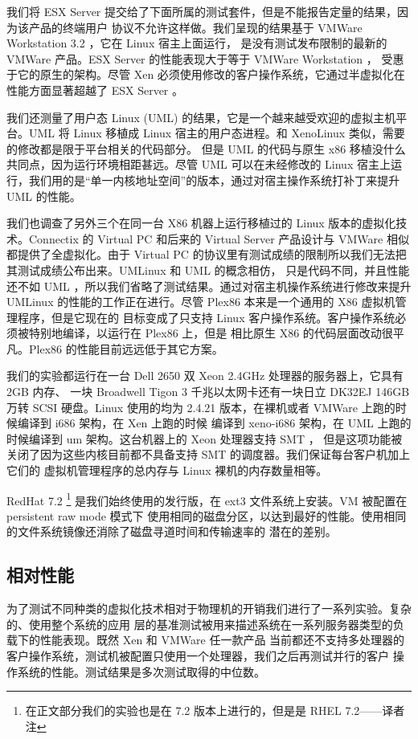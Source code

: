 我们将 ESX Server 提交给了下面所属的测试套件，但是不能报告定量的结果，因为该产品的终端用户
协议不允许这样做。我们呈现的结果基于 VMWare Workstation 3.2 ，它在 Linux 宿主上面运行，
是没有测试发布限制的最新的 VMWare 产品。ESX Server 的性能表现大于等于 VMWare Workstation ，
受惠于它的原生的架构。尽管 Xen 必须使用修改的客户操作系统，它通过半虚拟化在性能方面显著超越了
ESX Server 。

我们还测量了用户态 Linux (UML) 的结果，它是一个越来越受欢迎的虚拟主机平台。UML 将 Linux
移植成 Linux 宿主的用户态进程。和 XenoLinux 类似，需要的修改都是限于平台相关的代码部分。
但是 UML 的代码与原生 x86 移植没什么共同点，因为运行环境相距甚远。尽管 UML 可以在未经修改的
Linux 宿主上运行，我们用的是“单一内核地址空间”的版本，通过对宿主操作系统打补丁来提升 UML 的性能。

我们也调查了另外三个在同一台 X86 机器上运行移植过的 Linux 版本的虚拟化技术。Connectix 的
Virtual PC 和后来的 Virtual Server 产品设计与 VMWare 相似都提供了全虚拟化。由于 Virtual
PC 的协议里有测试成绩的限制所以我们无法把其测试成绩公布出来。UMLinux 和 UML 的概念相仿，
只是代码不同，并且性能还不如 UML ，所以我们省略了测试结果。通过对宿主机操作系统进行修改来提升
UMLinux 的性能的工作正在进行。尽管 Plex86 本来是一个通用的 X86 虚拟机管理程序，但是它现在的
目标变成了只支持 Linux 客户操作系统。客户操作系统必须被特别地编译，以运行在 Plex86 上，但是
相比原生 X86 的代码层面改动很平凡。Plex86 的性能目前远远低于其它方案。

我们的实验都运行在一台 Dell 2650 双 Xeon 2.4GHz 处理器的服务器上，它具有 2GB 内存、
一块 Broadwell Tigon 3 千兆以太网卡还有一块日立 DK32EJ 146GB 万转 SCSI 硬盘。Linux
使用的均为 2.4.21 版本，在裸机或者 VMWare 上跑的时候编译到 i686 架构，在 Xen 上跑的时候
编译到 xeno-i686 架构，在 UML 上跑的时候编译到 um 架构。这台机器上的 Xeon 处理器支持 SMT ，
但是这项功能被关闭了因为这些内核目前都不具备支持 SMT 的调度器。我们保证每台客户机加上它们的
虚拟机管理程序的总内存与 Linux 裸机的内存数量相等。

RedHat 7.2 \footnote{在正文部分我们的实验也是在 7.2 版本上进行的，但是是 RHEL 7.2——译者注}
是我们始终使用的发行版，在 ext3 文件系统上安装。VM 被配置在 persistent raw mode 模式下
使用相同的磁盘分区，以达到最好的性能。使用相同的文件系统镜像还消除了磁盘寻道时间和传输速率的
潜在的差别。

\subsection{相对性能}

为了测试不同种类的虚拟化技术相对于物理机的开销我们进行了一系列实验。复杂的、使用整个系统的应用
层的基准测试被用来描述系统在一系列服务器类型的负载下的性能表现。既然 Xen 和 VMWare 任一款产品
当前都还不支持多处理器的客户操作系统，测试机被配置只使用一个处理器，我们之后再测试并行的客户
操作系统的性能。测试结果是多次测试取得的中位数。

